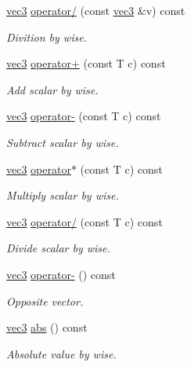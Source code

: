\begin{DoxyCompactItemize}
\mbox{\hyperlink{struct_space_h_1_1vec3}{vec3}} \mbox{\hyperlink{struct_space_h_1_1vec3_ab9d46a10bb578ff6939ed9280cb12df8}{operator/}} (const \mbox{\hyperlink{struct_space_h_1_1vec3}{vec3}} \&v) const
\begin{DoxyCompactList}\small\item\em Divition by wise. \end{DoxyCompactList}\item 
\mbox{\hyperlink{struct_space_h_1_1vec3}{vec3}} \mbox{\hyperlink{struct_space_h_1_1vec3_a9271a40ff2a3d64a97f37e53fb668d07}{operator+}} (const T c) const
\begin{DoxyCompactList}\small\item\em Add scalar by wise. \end{DoxyCompactList}\item 
\mbox{\hyperlink{struct_space_h_1_1vec3}{vec3}} \mbox{\hyperlink{struct_space_h_1_1vec3_a05e464381d8e6757e6604fd42a62fec6}{operator-\/}} (const T c) const
\begin{DoxyCompactList}\small\item\em Subtract scalar by wise. \end{DoxyCompactList}\item 
\mbox{\hyperlink{struct_space_h_1_1vec3}{vec3}} \mbox{\hyperlink{struct_space_h_1_1vec3_adb9a23774fc263d23487bdc6d2e253ce}{operator$\ast$}} (const T c) const
\begin{DoxyCompactList}\small\item\em Multiply scalar by wise. \end{DoxyCompactList}\item 
\mbox{\hyperlink{struct_space_h_1_1vec3}{vec3}} \mbox{\hyperlink{struct_space_h_1_1vec3_af3f90f3a0f92d6ee7bd8b413b14d2aaf}{operator/}} (const T c) const
\begin{DoxyCompactList}\small\item\em Divide scalar by wise. \end{DoxyCompactList}\item 
\mbox{\hyperlink{struct_space_h_1_1vec3}{vec3}} \mbox{\hyperlink{struct_space_h_1_1vec3_a74db760e195c089b32b5319e9d45028e}{operator-\/}} () const
\begin{DoxyCompactList}\small\item\em Opposite vector. \end{DoxyCompactList}\item 
\mbox{\hyperlink{struct_space_h_1_1vec3}{vec3}} \mbox{\hyperlink{struct_space_h_1_1vec3_af82905f49546b9aa03799dcd87bdff0c}{abs}} () const
\begin{DoxyCompactList}\small\item\em Absolute value by wise. \end{DoxyCompactList}\item 

\end{DoxyCompactItemize}
